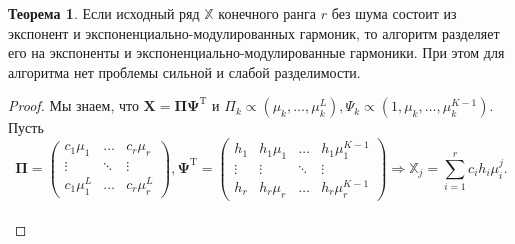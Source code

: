 \documentclass[specialist, substylefile = spbureport.rtx, subf,href,colorlinks=true, 12pt]{disser}
\theoremstyle{definition}
\newtheorem{theorem}{Теорема}
\begin{document}
\begin{theorem}
Если исходный ряд $\mathbb{X}$ конечного ранга $r$ без шума состоит из экспонент и экспоненциально-модулированных гармоник, то алгоритм разделяет его на экспоненты и экспоненциально-модулированные гармоники. При этом для алгоритма нет проблемы сильной и слабой разделимости.
\end{theorem}
\begin{proof}
Мы знаем, что $\mathbf{X} = \mathbf{\Pi\Psi}^{\mathrm{T}}$ и $\Pi_k \propto (\mu_k, \dots ,\mu^L_k), \Psi_k \propto (1, \mu_k, \dots ,\mu^{K-1}_k)$. Пусть
\begin{equation*}\
    \mathbf{\Pi} = \begin{pmatrix}
        c_1\mu_1 & \dots & c_r\mu_r \\
        \vdots & \ddots & \vdots \\
        c_1\mu_1^L & \dots & c_r\mu_r^L
    \end{pmatrix}, \mathbf{\Psi}^{\mathrm{T}} =
    \begin{pmatrix}
        h_1 & h_1\mu_1 & \dots & h_1\mu_1^{K - 1} \\
        \vdots & \vdots & \ddots & \vdots \\
        h_r & h_r\mu_r & \dots & h_r\mu_r^{K - 1}
    \end{pmatrix} \Rightarrow  \mathbb{X}_j = \sum_{i = 1}^{r}c_i h_i \mu_i^j.
\end{equation*} \\



\end{proof}
\end{document}
